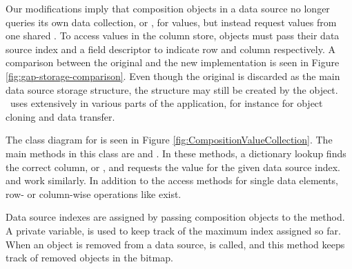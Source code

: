 Our modifications imply that composition objects in a data source no longer queries its own data collection, or , for values, but instead request values from one shared . To access values in the column store, objects must pass their data source index and a field descriptor to indicate row and column respectively. A comparison between the original and the new implementation is seen in Figure \ref{fig:gap-storage-comparison}. Even though the original  is discarded as the main data source storage structure, the structure may still be created by the object. \gap~uses  extensively in various parts of the application, for instance for object cloning and data transfer. 

The class diagram for  is seen in Figure \ref{fig:CompositionValueCollection}. The main methods in this class are  and . In these methods, a dictionary lookup finds the correct column, or , and requests the value for the given data source index.  and  work similarly. In addition to the access methods for single data elements, row- or column-wise operations like  exist. 

Data source indexes are assigned by passing composition objects to the  method. A private variable,  is used to keep track of the maximum index assigned so far. When an object is removed from a data source,  is called, and this method keeps track of removed objects in the  bitmap.



